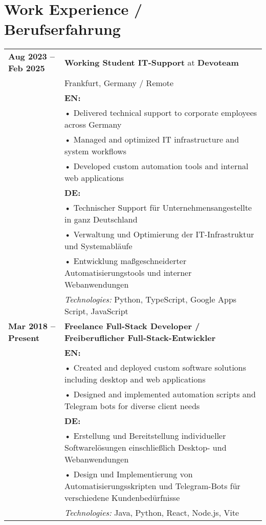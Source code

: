 \documentclass[11pt,a4paper]{article}
\begin{document}
\section*{Work Experience / Berufserfahrung}
\begin{tabularx}{\textwidth}{@{}l X@{}}
\textbf{Aug 2023 -- Feb 2025} & \textbf{Working Student IT-Support} at \textbf{Devoteam}\\
& Frankfurt, Germany / Remote\\[0.3em]
& \textbf{EN:} \\
& • Delivered technical support to corporate employees across Germany \\
& • Managed and optimized IT infrastructure and system workflows \\
& • Developed custom automation tools and internal web applications \\[0.3em]
& \textbf{DE:} \\
& • Technischer Support für Unternehmensangestellte in ganz Deutschland \\
& • Verwaltung und Optimierung der IT-Infrastruktur und Systemabläufe \\
& • Entwicklung maßgeschneiderter Automatisierungstools und interner Webanwendungen \\[0.3em]
& \textit{Technologies:} Python, TypeScript, Google Apps Script, JavaScript\\[0.8em]

\textbf{Mar 2018 -- Present} & \textbf{Freelance Full-Stack Developer / Freiberuflicher Full-Stack-Entwickler}\\[0.3em]
& \textbf{EN:} \\
& • Created and deployed custom software solutions including desktop and web applications \\
& • Designed and implemented automation scripts and Telegram bots for diverse client needs \\[0.3em]
& \textbf{DE:} \\
& • Erstellung und Bereitstellung individueller Softwarelösungen einschließlich Desktop- und Webanwendungen \\
& • Design und Implementierung von Automatisierungsskripten und Telegram-Bots für verschiedene Kundenbedürfnisse \\[0.3em]
& \textit{Technologies:} Java, Python, React, Node.js, Vite
\end{tabularx}
\end{document}
